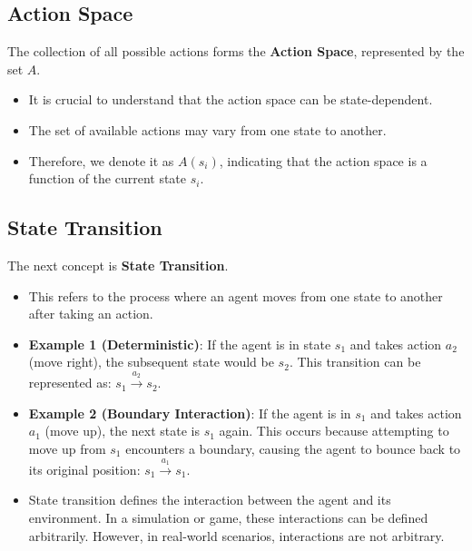 \documentclass{article}
\begin{document}
\subsection*{Action Space}
The collection of all possible actions forms the \textbf{Action Space}, represented by the set $A$.
\begin{itemize}[noitemsep]
    \item It is crucial to understand that the action space can be state-dependent.
    \item The set of available actions may vary from one state to another.
    \item Therefore, we denote it as $A(s_i)$, indicating that the action space is a function of the current state $s_i$.
\end{itemize}

\subsection*{State Transition}
The next concept is \textbf{State Transition}.
\begin{itemize}[noitemsep]
    \item This refers to the process where an agent moves from one state to another after taking an action.
    \item \textbf{Example 1 (Deterministic)}: If the agent is in state $s_1$ and takes action $a_2$ (move right), the subsequent state would be $s_2$. This transition can be represented as: $s_1 \xrightarrow{a_2} s_2$.
    \item \textbf{Example 2 (Boundary Interaction)}: If the agent is in $s_1$ and takes action $a_1$ (move up), the next state is $s_1$ again. This occurs because attempting to move up from $s_1$ encounters a boundary, causing the agent to bounce back to its original position: $s_1 \xrightarrow{a_1} s_1$.
    \item State transition defines the interaction between the agent and its environment. In a simulation or game, these interactions can be defined arbitrarily. However, in real-world scenarios, interactions are not arbitrary.
\end{itemize}
\end{document}
